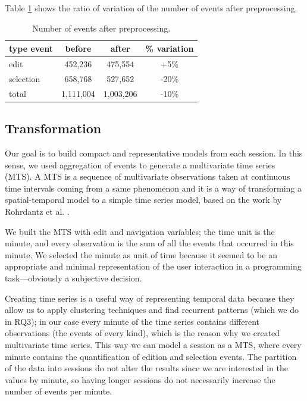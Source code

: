 \documentclass[times]{smrauth}
\begin{document}
Table \ref{tbl:mass_events} shows the ratio of variation of the number of events after preprocessing.

\begin{table}[hb!]
	\small
	\renewcommand{\arraystretch}{1.3}
	\caption{Number of events after preprocessing.}
	\label{tbl:mass_events}
	\centering
	\begin{tabular}{l | c | c | c } 
		type event & before & after & \% variation  \\  
		\hline 
		edit &	 452,236 & 475,554 &	+5\%   \\
		selection &	658,768 & 527,652 & -20\%   \\
		\hline
		total & 1,111,004 & 1,003,206 & -10\%  \\
	\end{tabular}
\end{table}

\subsection{Transformation}
Our goal is to build compact and representative models from each session. In this sense, we used aggregation of events to generate a multivariate time series (MTS). A MTS is a sequence of multivariate observations taken at continuous time intervals coming from a same phenomenon and it is a way of transforming a spatial-temporal model to a simple time series model, based on the work by Rohrdantz et al. \cite{RHD12}.  

We built the MTS with edit and navigation variables; the time unit is the minute, and every observation is the sum of all the events that occurred in this minute. We selected the minute as unit of time because it seemed to be an appropriate and minimal representation of the user interaction in a programming task---obviously a subjective decision. 

Creating time series is a useful way of representing temporal data because they allow us to apply clustering techniques and find recurrent patterns (which we do in RQ3); in our case every minute of the time series contains different observations (the events of every kind), which is the reason why we created multivariate time series. This way we can model a session as a MTS, where every minute contains the quantification of edition and selection events. The partition of the data into sessions do not alter the results since we are interested in the values by minute, so having longer sessions do not necessarily increase the number of events per minute.
\end{document}
